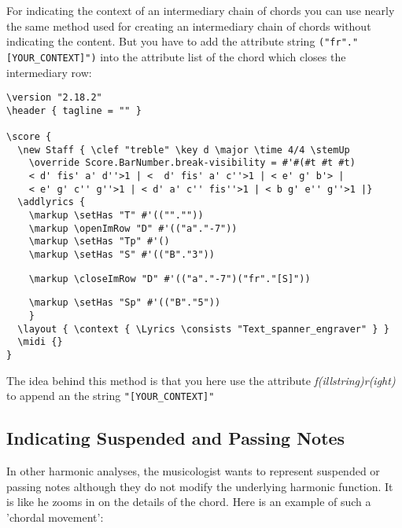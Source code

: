 \documentclass[
  DIV=calc,
  BCOR=5mm,
  12pt,
  headings=small,
  oneside,
  abstract=true,
  toc=bib,
  xcolor=dvipsnames,
  openany,
  ngerman,english]{scrartcl}
\newcommand{\acc}[0]{\textit}
\begin{document}
For indicating the context of an intermediary chain of chords you can use nearly
the same method used for creating an intermediary chain of chords without
indicating the content. But you have to add the attribute string
\texttt{("fr"."[YOUR\_CONTEXT]")} into the attribute list of the chord which
closes the intermediary row:

\begin{scriptsize}
\begin{verbatim}
\version "2.18.2"
\header { tagline = "" }

\score {
  \new Staff { \clef "treble" \key d \major \time 4/4 \stemUp 
    \override Score.BarNumber.break-visibility = #'#(#t #t #t)
    < d' fis' a' d''>1 | <  d' fis' a' c''>1 | < e' g' b'> |
    < e' g' c'' g''>1 | < d' a' c'' fis''>1 | < b g' e'' g''>1 |}
  \addlyrics { 
    \markup \setHas "T" #'((""."")) 
    \markup \openImRow "D" #'(("a"."-7")) 
    \markup \setHas "Tp" #'() 
    \markup \setHas "S" #'(("B"."3"))     
\end{verbatim}
{ \color{red} \verb|    \markup \closeImRow "D" #'(("a"."-7")("fr"."[S]"))| }
\begin{verbatim} 
    \markup \setHas "Sp" #'(("B"."5"))
    }
  \layout { \context { \Lyrics \consists "Text_spanner_engraver" } }
  \midi {}
}
\end{verbatim}
\end{scriptsize}

The idea behind this method is that you here use the attribute
\acc{f(illstring)r(ight)} to append an the string \texttt{"[YOUR\_CONTEXT]"} 

\subsection{Indicating Suspended and Passing Notes}

In other harmonic analyses, the musicologist wants to represent suspended or
passing notes although they do not modify the underlying harmonic function. It
is like he zooms in on the details of the chord. Here is an example of such a
'chordal movement':
\end{document}
